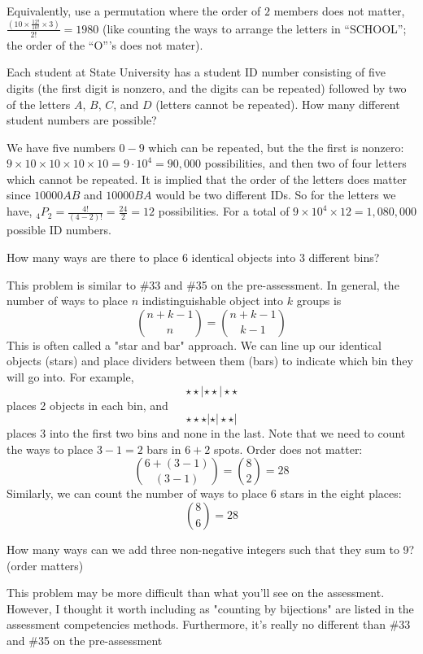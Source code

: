\documentclass{exam}
\begin{document}
\begin{questions}
\begin{parts}
\begin{solution}
            Equivalently, use a permutation where the order of $2$ members
            does not matter, $\frac{\left( 10\times\frac{12!}{10!}\times 3 \right) }{2!}=1980$
            (like counting the ways to arrange the letters in ``SCHOOL''; the
            order of the ``O'''s does not mater).
        \end{solution}
    \end{parts}

    
\question Each student at State University has a student ID number consisting
of five digits (the first digit is nonzero, and the digits can be
repeated) followed by two of the letters $A$, $B$, $C$, and $D$
(letters cannot be repeated). How many different student numbers are
possible?
    \begin{solution}
        We have five numbers $0-9$ which can be repeated, but the the
        first is nonzero: $9\times10\times10\times10\times10=9\cdot10^{4}=90,000$
        possibilities, and then two of four letters which cannot be repeated.
        It is implied that the order of the letters does matter since $10000AB$
        and $10000BA$ would be two different IDs. So for the letters we have,
        $_{4}P_{2}=\frac{4!}{(4-2)!}=\frac{24}{2}=12$ possibilities. For
        a total of $9\times10^{4}\times12=1,080,000$ possible ID numbers.
    \end{solution}


\question How many ways are there to place 6 identical objects into 3 different bins? 
\begin{solution}
This problem is similar to \#33 and \#35 on the pre-assessment. In general, the number of ways to place $n$ indistinguishable object into $k$ groups is $${n+k-1 \choose n} = {n+k-1 \choose k-1}$$ This is often called a "star and bar" approach. We can line up our identical objects (stars) and place dividers between them (bars) to indicate which bin they will go into. For example, $$\star \star | \star \star | \star \star$$ places 2 objects in each bin, and $$\star \star  \star | \star | \star \star |$$ places 3 into the first two bins and none in the last. Note that we need to count the ways to place $3-1=2$ bars in $6+2$ spots. Order does not matter: $${6+(3-1) \choose (3-1)} = {8 \choose 2}=28$$ Similarly, we can count the number of ways to place 6 stars in the eight places: $${8 \choose 6} = 28$$
\end{solution}


\question How many ways can we add three non-negative integers such that they sum to 9? (order matters)
\begin{solution}
This problem may be more difficult than what you'll see on the assessment. However, I thought it worth including as "counting by bijections" are listed in the assessment competencies methods. Furthermore, it's really no different than \#33 and \#35 on the pre-assessment\\ 


\end{solution}
\end{questions}
\end{document}
